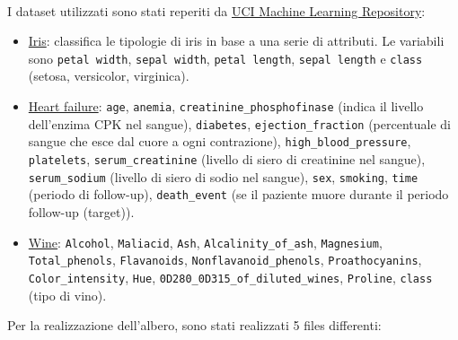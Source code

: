 \documentclass{article}
\begin{document}
\\
I dataset utilizzati sono stati reperiti da \href{https://archive.ics.uci.edu/}{UCI Machine Learning Repository}:
\begin{itemize}
	\item \href{https://archive.ics.uci.edu/dataset/53/iris}{Iris}: classifica le tipologie di iris in base a una serie di attributi. Le variabili sono \texttt{petal width}, \texttt{sepal width}, \texttt{petal length}, \texttt{sepal length} e \texttt{class} (setosa, versicolor, virginica).
	\item \href{https://archive.ics.uci.edu/dataset/519/heart+failure+clinical+records}{Heart failure}: \texttt{age}, \texttt{anemia}, \texttt{creatinine\_phosphofinase} (indica il livello dell'enzima CPK nel sangue), \texttt{diabetes}, \texttt{ejection\_fraction} (percentuale di sangue che esce dal cuore a ogni contrazione), \texttt{high\_blood\_pressure}, \texttt{platelets}, \texttt{serum\_creatinine} (livello di siero di creatinine nel sangue), \texttt{serum\_sodium} (livello di siero di sodio nel sangue), \texttt{sex}, \texttt{smoking}, \texttt{time} (periodo di follow-up), \texttt{death\_event} (se il paziente muore durante il periodo follow-up (target)).
	\item \href{https://archive.ics.uci.edu/dataset/109/wine}{Wine}: \texttt{Alcohol}, \texttt{Maliacid}, \texttt{Ash}, \texttt{Alcalinity\_of\_ash}, \texttt{Magnesium}, \texttt{Total\_phenols}, \texttt{Flavanoids}, \texttt{Nonflavanoid\_phenols}, \texttt{Proathocyanins}, \texttt{Color\_intensity}, \texttt{Hue}, \texttt{0D280\_0D315\_of\_diluted\_wines}, \texttt{Proline}, \texttt{class} (tipo di vino).
\end{itemize}
Per la realizzazione dell'albero, sono stati realizzati 5 files differenti:
\end{document}
